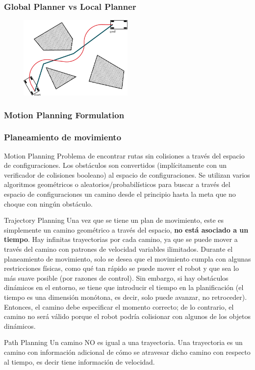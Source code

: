 \begin{frame}
	\frametitle{Global Planner vs Local Planner}
	
	\begin{figure}[!h]
		\includegraphics[width=0.5\textwidth]{images/global_local_plan.pdf}
	\end{figure}
	
\end{frame}

\begin{frame}
	\frametitle{Motion Planning Formulation}
	
\end{frame}


\begin{frame}
	\frametitle{Planeamiento de movimiento}
	
	\begin{block}{Motion Planning}
		Problema de encontrar rutas sin colisiones a través del espacio de configuraciones. Los obstáculos son convertidos (implícitamente con un verificador de colisiones booleano) al espacio de configuraciones. Se utilizan varios algoritmos geométricos o aleatorios/probabilísticos para buscar a través del espacio de configuraciones un camino desde el principio hasta la meta que no choque con ningún obstáculo.
	\end{block}

	\begin{block}{Trajectory Planning}
		Una vez que se tiene un plan de movimiento, este es simplemente un camino geométrico a través del espacio, {\bf no está asociado a un tiempo}. Hay infinitas trayectorias por  cada camino, ya que se puede mover a través del camino con patrones de velocidad variables ilimitados. Durante el planeamiento de movimiento, solo se desea que el movimiento cumpla con algunas restricciones físicas, como qué tan rápido se puede mover el robot y que sea lo más suave posible (por razones de control). Sin embargo, si hay obstáculos dinámicos en el entorno, se tiene que introducir el tiempo en la planificación (el tiempo es una dimensión monótona, es decir, solo puede avanzar, no retroceder). Entonces, el camino debe especificar el momento correcto; de lo contrario, el camino no será válido porque el robot podría colisionar con algunos de los objetos dinámicos.
	\end{block}

	\begin{block}{Path Planning}
	Un camino NO es igual a una trayectoria. Una trayectoria es un camino con información adicional de cómo se atravesar dicho camino con respecto al tiempo, es decir tiene información de velocidad.
	\end{block}
\end{frame}


